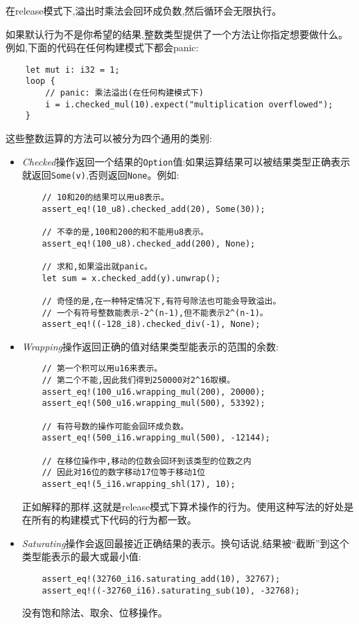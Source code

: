 在release模式下,溢出时乘法会回环成负数,然后循环会无限执行。

如果默认行为不是你希望的结果,整数类型提供了一个方法让你指定想要做什么。例如,下面的代码在任何构建模式下都会panic:
\begin{verbatim}
    let mut i: i32 = 1;
    loop {
        // panic: 乘法溢出(在任何构建模式下)
        i = i.checked_mul(10).expect("multiplication overflowed");
    }
\end{verbatim}

这些整数运算的方法可以被分为四个通用的类别:
\begin{itemize}
    \item \emph{Checked}操作返回一个结果的\texttt{Option}值:如果运算结果可以被结果类型正确表示就返回\texttt{Some(v)},否则返回\texttt{None}。例如:
    \begin{verbatim}
    // 10和20的结果可以用u8表示。
    assert_eq!(10_u8).checked_add(20), Some(30));

    // 不幸的是,100和200的和不能用u8表示。
    assert_eq!(100_u8).checked_add(200), None);

    // 求和,如果溢出就panic。
    let sum = x.checked_add(y).unwrap();

    // 奇怪的是,在一种特定情况下,有符号除法也可能会导致溢出。
    // 一个有符号整数能表示-2^(n-1),但不能表示2^(n-1)。
    assert_eq!((-128_i8).checked_div(-1), None);
    \end{verbatim}

    \item \emph{Wrapping}操作返回正确的值对结果类型能表示的范围的余数:
    \begin{verbatim}
    // 第一个积可以用u16来表示。
    // 第二个不能,因此我们得到250000对2^16取模。
    assert_eq!(100_u16.wrapping_mul(200), 20000);
    assert_eq!(500_u16.wrapping_mul(500), 53392);

    // 有符号数的操作可能会回环成负数。
    assert_eq!(500_i16.wrapping_mul(500), -12144);

    // 在移位操作中,移动的位数会回环到该类型的位数之内
    // 因此对16位的数字移动17位等于移动1位
    assert_eq!(5_i16.wrapping_shl(17), 10);
    \end{verbatim}
    正如解释的那样,这就是release模式下算术操作的行为。使用这种写法的好处是在所有的构建模式下代码的行为都一致。

    \item \emph{Saturating}操作会返回最接近正确结果的表示。换句话说,结果被“截断”到这个类型能表示的最大或最小值:
    \begin{verbatim}
    assert_eq!(32760_i16.saturating_add(10), 32767);
    assert_eq!((-32760_i16).saturating_sub(10), -32768);
    \end{verbatim}
    没有饱和除法、取余、位移操作。


\end{itemize}
